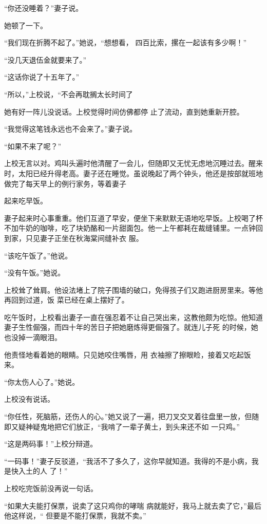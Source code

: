 \documentclass{article}
\begin{document}
“你还没睡着？”妻子说。 



她顿了一下。 

\newpage

“我们现在折腾不起了。”她说，“想想看，
四百比索，摞在一起该有多少啊！” 


“没几天退伍金就要来了。” 


“这话你说了十五年了。” 

“所以，”上校说，“不会再耽搁太长时间了

她有好一阵儿没说话。上校觉得时间仿佛都停
止了流动，直到她重新开腔。 

“我觉得这笔钱永远也不会来了。”妻子说。



“如果不来了呢？” 

上校无言以对。鸡叫头遍时他清醒了一会儿，但随即又无忧无虑地沉睡过去。醒来时，太阳已经升得老高。妻子还在睡觉。虽说晚起了两个钟头，他还是按部就班地做完了每天早上的例行家务，等着妻子
\newpage

起来吃早饭。 

妻子起来时心事重重。他们互道了早安，便坐下来默默无语地吃早饭。上校喝了杯不加牛奶的咖啡，吃了块奶酪和一片甜面包。他一上午都耗在裁缝铺里。一点钟回到家，只见妻子正坐在秋海棠间缝补衣
服。 


“该吃午饭了。”他说。 


“没有午饭。”她说。 

上校耸了耸肩。他设法堵上了院子围墙的破口，免得孩子们又跑进厨房里来。等他再回到过道，饭
菜已经在桌上摆好了。 

吃午饭时，上校看出妻子一直在强忍着不让自己哭出来，这教他颇为吃惊。他知道妻子生性倔强，而四十年的苦日子把她磨炼得更倔强了。就连儿子死
的时候，她也没掉一滴眼泪。 

\newpage

他责怪地看着她的眼睛。只见她咬住嘴唇，用
衣袖擦了擦眼睑，接着又吃起饭来。 


“你太伤人心了。”她说。 


上校没有说话。 

“你任性，死脑筋，还伤人的心。”她又说了一遍，把刀叉交叉着往盘里一放，但随即又疑神疑鬼地把它们放正，“我啃了一辈子黄土，到头来还不如
一只鸡。” 


“这是两码事！”上校分辩道。 

“一码事！”妻子反驳道，“我活不了多久了，这你早就知道。我得的不是小病，我是快入土的人
了！” 


上校吃完饭前没再说一句话。 

“如果大夫能打保票，说卖了这只鸡你的哮喘
\newpage
病就能好，我马上就去卖了它，”最后他这样说，“
但要是不能打保票，我就不卖。” 
\end{document}

